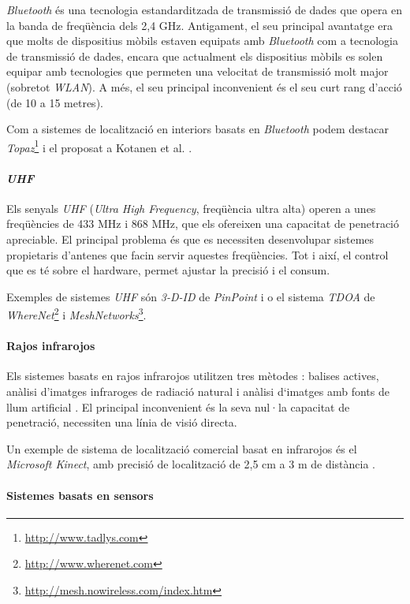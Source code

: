 \textit{Bluetooth} és una tecnologia estandarditzada de transmissió de dades que opera en la banda de freqüència dels 2,4 GHz. Antigament, el seu principal avantatge era que molts de dispositius mòbils estaven equipats amb \textit{Bluetooth} com a tecnologia de transmissió de dades, encara que actualment els dispositius mòbils es solen equipar amb tecnologies que permeten una velocitat de transmissió molt major (sobretot \textit{WLAN}). A més, el seu principal inconvenient és el seu curt rang d'acció (de 10 a 15 metres).

Com a sistemes de localització en interiors basats en \textit{Bluetooth} podem destacar \textit{Topaz}\footnote{\url{http://www.tadlys.com}} i el proposat a Kotanen et al. \cite{kotanen}.

\paragraph{\textit{UHF}}

Els senyals \textit{UHF} (\textit{Ultra High Frequency}, freqüència ultra alta) operen a unes freqüències de 433 MHz i 868 MHz, que els ofereixen una capacitat de penetració apreciable. El principal problema és que es necessiten desenvolupar sistemes propietaris d'antenes que facin servir aquestes freqüències. Tot i així, el control que es té sobre el hardware, permet ajustar la precisió i el consum.

Exemples de sistemes \textit{UHF} són \textit{3-D-ID} de \textit{PinPoint} \cite{werb} i o el sistema \textit{TDOA} de \textit{WhereNet}\footnote{\url{http://www.wherenet.com}} i \textit{MeshNetworks}\footnote{\url{http://mesh.nowireless.com/index.htm}}.

\paragraph{Rajos infrarojos}

Els sistemes basats en rajos infrarojos utilitzen tres mètodes \cite{chan}: balises actives, anàlisi d’imatges infraroges de radiació natural i anàlisi d‘imatges amb fonts de llum artificial \cite{mautz}. El principal inconvenient és la seva nul·la capacitat de penetració, necessiten una línia de visió directa.

Un exemple de sistema de localització comercial basat en infrarojos és el \textit{Microsoft Kinect}, amb precisió de localització de 2,5 cm a 3 m de distància \cite{khoshelham}.

\paragraph{Sistemes basats en sensors}

